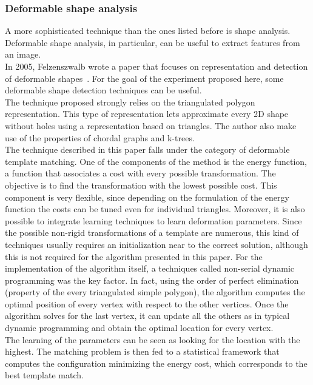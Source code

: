 \documentclass[conference]{IEEEtran}
\begin{document}
			\subsubsection{Deformable shape analysis}
		
				A more sophisticated technique than the ones listed before is shape analysis. Deformable shape analysis, in particular, can be useful to extract features from an image.\\
				In 2005, Felzenszwalb wrote a paper that focuses on representation and detection of deformable shapes~\cite{4}. For the goal of the experiment proposed here, some deformable shape 
				detection techniques can be useful. \\
				The technique proposed strongly relies on the triangulated polygon representation. This type of representation lets approximate every 2D shape without holes using a representation based on triangles. 
				The author also make use of the properties of chordal graphs and k-trees.\\
				The technique described in this paper falls under the category of deformable template matching. One of the components of the method is the energy function, a function that associates a cost with every 
				possible transformation. The objective is to find the transformation with the lowest possible cost. This component is very flexible, since depending on the formulation of the energy function the costs 
				can be tuned even for individual triangles. Moreover, it is also possible to integrate learning techniques to learn deformation parameters.
				Since the possible non-rigid transformations of a template are numerous, this kind of techniques usually requires an initialization near to the correct solution, 
				although this is not required for the algorithm presented in this paper. 
				For the implementation of the algorithm itself, a techniques called non-serial dynamic programming was the key factor. In fact, using the order of perfect elimination (property of the every triangulated 
				simple polygon), the algorithm computes the optimal position of every vertex with respect to the other vertices. Once the algorithm solves for the last vertex, it can 
				update all the others as in typical dynamic programming and obtain the optimal location for every vertex.\\
				The learning of the parameters can be seen as looking for the location with the highest. The matching problem is then fed to a statistical framework that computes the configuration minimizing the 
				energy cost, which corresponds to the best template match.
				
\end{document}
